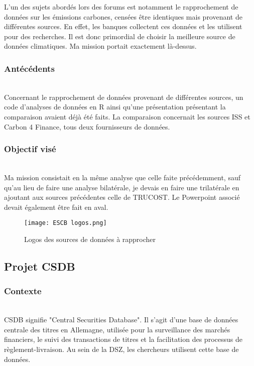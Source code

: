 L'un des sujets abordés lors des forums est notamment le rapprochement de données sur les émissions carbones, censées être identiques mais provenant de différentes sources.
En effet, les banques collectent ces données et les utilisent pour des recherches. Il est donc primordial de choisir la meilleure source de données climatiques.
Ma mission portait exactement là-dessus.

\subsubsection{Antécédents}
~\\
Concernant le rapprochement de données provenant de différentes sources, un code d'analyses de données en R ainsi qu'une présentation présentant la comparaison avaient déjà été faits.
La comparaison concernait les sources ISS et Carbon 4 Finance, tous deux fournisseurs de données. 

\subsubsection{Objectif visé}
~\\
Ma mission consistait en la même analyse que celle faite précédemment, sauf qu'au lieu de faire une analyse bilatérale, je devais en faire une trilatérale en ajoutant aux sources précédentes celle de TRUCOST.
Le Powerpoint associé devait également être fait en aval.

\begin{figure}[H]
    \centering
    \texttt{[image: ESCB logos.png]}
    \caption{Logos des sources de données à rapprocher}
\end{figure}

\pagebreak

\subsection{Projet CSDB}

\subsubsection{Contexte}
~\\
CSDB signifie "Central Securities Database". Il s'agit d'une base de données centrale des titres en Allemagne, utilisée pour la surveillance des marchés financiers, le suivi des transactions de titres et la facilitation des processus de règlement-livraison.
Au sein de la DSZ, les chercheurs utilisent cette base de données.
\\

